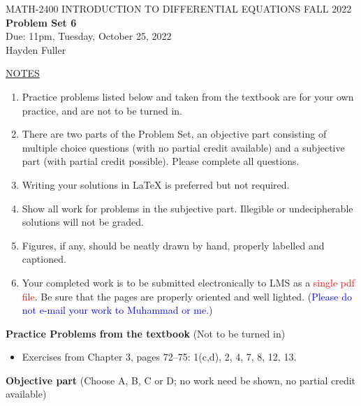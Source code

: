 \documentclass{article}
\begin{document}
\begin{center}
\large{ MATH-2400 \hspace{.27in}  INTRODUCTION TO DIFFERENTIAL EQUATIONS \hspace{.27in}FALL 2022\bigskip\\ {\bf Problem Set 6} \smallskip\\ Due: 11pm, Tuesday, October 25, 2022}
\\Hayden Fuller
\end{center}

\bigskip\noindent
\underline{NOTES}
\begin{enumerate}
\item Practice problems listed below and taken from the textbook are for your own practice, and are not to be turned in.
\item There are two parts of the Problem Set, an objective part consisting of multiple choice questions (with no partial credit available) and a subjective part (with partial credit possible).  Please complete all questions.
\item Writing your solutions in {\LaTeX} is preferred but not required.
\item Show all work for problems in the subjective part.  Illegible or undecipherable solutions will not be graded. 
\item Figures, if any, should be neatly drawn by hand, properly labelled and captioned.  
\item Your completed work is to be submitted electronically to LMS  as a \textcolor{red}{single pdf file}. Be sure that the pages are properly oriented and well lighted.  (\textcolor{blue}{Please do not e-mail your work to Muhammad or me.})
\end{enumerate}

\bigskip\noindent
{\bf Practice Problems from the textbook} (Not to be turned in)
\begin{itemize}
\item
Exercises from Chapter 3, pages 72--75: 1(c,d), 2, 4, 7, 8, 12, 13.
\end{itemize}

\bigskip\noindent
{\bf Objective part} (Choose A, B, C or D; no work need be shown, no partial credit available)
\end{document}
